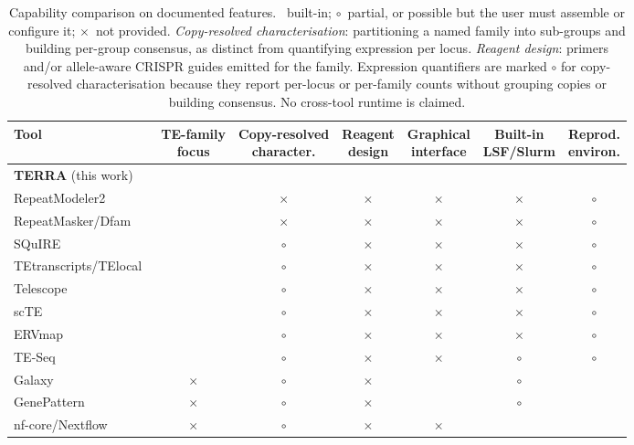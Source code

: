 \documentclass[11pt]{article}
\newcommand{\cYes}{\textcolor{green!45!black}{\checkmark}}
\newcommand{\cPart}{\textcolor{orange!85!black}{$\circ$}}
\newcommand{\cNo}{\textcolor{black!30}{$\times$}}
\begin{document}
\begin{table}[h]
  \centering
  \footnotesize
  \setlength{\tabcolsep}{5pt}
  \renewcommand{\arraystretch}{1.2}
  \begin{tabular}{@{}l cccccc@{}}
    \toprule
    \textbf{Tool} &
      \shortstack{TE-family\\focus} &
      \shortstack{Copy-resolved\\character.} &
      \shortstack{Reagent\\design} &
      \shortstack{Graphical\\interface} &
      \shortstack{Built-in\\LSF/Slurm} &
      \shortstack{Reprod.\\environ.} \\
    \midrule
    \textbf{TERRA} (this work)                  & \cYes & \cYes  & \cYes  & \cYes & \cYes  & \cYes  \\
    RepeatModeler2~\citep{flynn2020}            & \cYes & \cNo   & \cNo   & \cNo  & \cNo   & \cPart \\
    RepeatMasker/Dfam~\citep{hubley2016}        & \cYes & \cNo   & \cNo   & \cNo  & \cNo   & \cPart \\
    SQuIRE~\citep{yang2019squire}               & \cYes & \cPart & \cNo   & \cNo  & \cNo   & \cPart \\
    TEtranscripts/TElocal~\citep{jin2015tetranscripts} & \cYes & \cPart & \cNo & \cNo & \cNo & \cPart \\
    Telescope~\citep{bendall2019telescope}      & \cYes & \cPart & \cNo   & \cNo  & \cNo   & \cPart \\
    scTE~\citep{he2021scte}                     & \cYes & \cPart & \cNo   & \cNo  & \cNo   & \cPart \\
    ERVmap~\citep{tokuyama2018ervmap}           & \cYes & \cPart & \cNo   & \cNo  & \cNo   & \cPart \\
    TE-Seq~\citep{kelsey2025teseq}              & \cYes & \cPart & \cNo   & \cNo  & \cPart & \cPart \\
    Galaxy~\citep{galaxy2022}                   & \cNo  & \cPart & \cNo   & \cYes & \cPart & \cYes  \\
    GenePattern~\citep{genepattern2006}         & \cNo  & \cPart & \cNo   & \cYes & \cPart & \cYes  \\
    nf-core/Nextflow~\citep{ewels2020}          & \cNo  & \cPart & \cNo   & \cNo  & \cYes  & \cYes  \\
    \bottomrule
  \end{tabular}
  \caption{Capability comparison on documented features. \cYes~built-in; \cPart~partial, or
    possible but the user must assemble or configure it; \cNo~not provided.
    \emph{Copy-resolved characterisation}: partitioning a named family into sub-groups and
    building per-group consensus, as distinct from quantifying expression per locus.
    \emph{Reagent design}: primers and/or allele-aware CRISPR guides emitted for the family.
    Expression quantifiers are marked \cPart{} for copy-resolved characterisation because they
    report per-locus or per-family counts without grouping copies or building consensus. No
    cross-tool runtime is claimed.}
  \label{tab:comparison}
\end{table}
\end{document}
